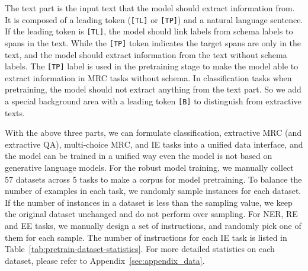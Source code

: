 The text part is the input text that the model should extract information from.
It is composed of a leading token (\verb|[TL]| or \verb|[TP]|) and a natural language sentence.
If the leading token is \verb|[TL]|, the model should link labels from schema labels to spans in the text.
While the \verb|[TP]| token indicates the target spans are only in the text, and the model should extract information from the text without schema labels.
The \verb|[TP]| label is used in the pretraining stage to make the model able to extract information in MRC tasks without schema.
In classification tasks when pretraining, the model should not extract anything from the text part.
So we add a special background area with a leading token \verb|[B]| to distinguish from extractive texts.

With the above three parts, we can formulate classification, extractive MRC (and extractive QA), multi-choice MRC, and IE tasks into a unified data interface, and the model can be trained in a unified way even the model is not based on generative language models.
For the robust model training, we manually collect 57 datasets across 5 tasks to make a corpus for model pretraining.
To balance the number of examples in each task, we randomly sample instances for each dataset.
If the number of instances in a dataset is less than the sampling value, we keep the original dataset unchanged and do not perform over sampling.
For NER, RE and EE tasks, we manually design a set of instructions, and randomly pick one of them for each sample.
The number of instructions for each IE task is listed in Table~\ref{tab:pretrain-dataset-statistics}.
For more detailed statistics on each dataset, please refer to Appendix~\ref{sec:appendix_data}.

\begin{table}[t]
    \centering
    \caption{
        Pretraining dataset statistics.
        $^{\clubsuit}$ Classification tasks contain multi-choice MRC datasets.
        $^{\heartsuit}$ MRC stands for both extractive QA and extractive MRC datasets.
    }
    \label{tab:pretrain-dataset-statistics}
\end{table}

